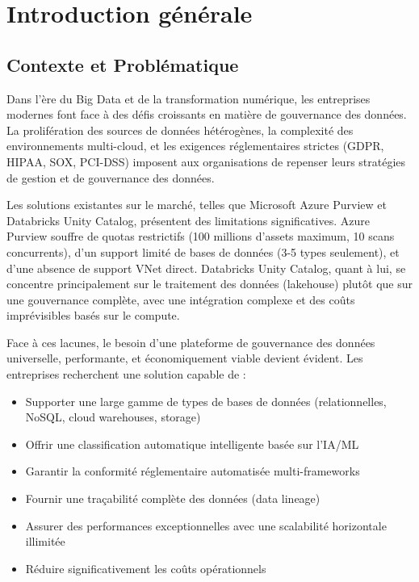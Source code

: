 \chapter*{Introduction générale}


\section*{Contexte et Problématique}

Dans l'ère du Big Data et de la transformation numérique, les entreprises modernes font face à des défis croissants en matière de gouvernance des données. La prolifération des sources de données hétérogènes, la complexité des environnements multi-cloud, et les exigences réglementaires strictes (GDPR, HIPAA, SOX, PCI-DSS) imposent aux organisations de repenser leurs stratégies de gestion et de gouvernance des données.

Les solutions existantes sur le marché, telles que Microsoft Azure Purview et Databricks Unity Catalog, présentent des limitations significatives. Azure Purview souffre de quotas restrictifs (100 millions d'assets maximum, 10 scans concurrents), d'un support limité de bases de données (3-5 types seulement), et d'une absence de support VNet direct. Databricks Unity Catalog, quant à lui, se concentre principalement sur le traitement des données (lakehouse) plutôt que sur une gouvernance complète, avec une intégration complexe et des coûts imprévisibles basés sur le compute.

Face à ces lacunes, le besoin d'une plateforme de gouvernance des données universelle, performante, et économiquement viable devient évident. Les entreprises recherchent une solution capable de :
\begin{itemize}
    \item Supporter une large gamme de types de bases de données (relationnelles, NoSQL, cloud warehouses, storage)
    \item Offrir une classification automatique intelligente basée sur l'IA/ML
    \item Garantir la conformité réglementaire automatisée multi-frameworks
    \item Fournir une traçabilité complète des données (data lineage)
    \item Assurer des performances exceptionnelles avec une scalabilité horizontale illimitée
    \item Réduire significativement les coûts opérationnels
\end{itemize}

